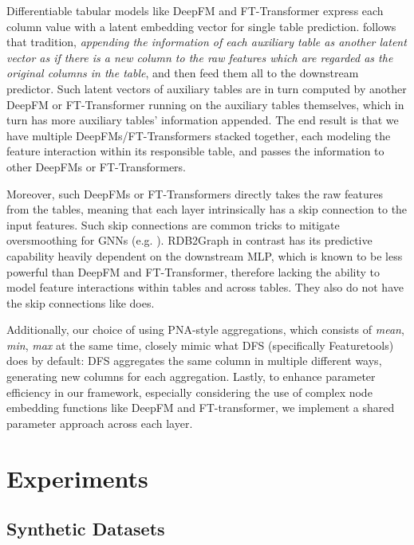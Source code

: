 Differentiable tabular models like DeepFM and FT-Transformer express each column value with a latent embedding vector for single table prediction.  \model{} follows that tradition, \emph{appending the information of each auxiliary table as another latent vector as if there is a new column to the raw features which are regarded as the original columns in the table}, and then feed them all to the downstream predictor.  Such latent vectors of auxiliary tables are in turn computed by another DeepFM or FT-Transformer running on the auxiliary tables themselves, which in turn has more auxiliary tables' information appended.  The end result is that we have multiple DeepFMs/FT-Transformers stacked together, each modeling the feature interaction within its responsible table, and passes the information to other DeepFMs or FT-Transformers.

Moreover, such DeepFMs or FT-Transformers directly takes the raw features from the tables, meaning that each \model{} layer intrinsically has a skip connection to the input features.  Such skip connections are common tricks to mitigate oversmoothing for GNNs (e.g. \cite{chen2020simple}). RDB2Graph in contrast has its predictive capability heavily dependent on the downstream MLP, which is known to be less powerful than DeepFM and FT-Transformer, therefore lacking the ability to model feature interactions within tables and across tables.  They also do not have the skip connections like \model{} does.

Additionally, our choice of using PNA-style aggregations, which consists of \textit{mean}, \textit{min}, \textit{max} at the same time, closely mimic what DFS (specifically Featuretools) does by default: DFS aggregates the same column in multiple different ways, generating new columns for each aggregation. Lastly, to enhance parameter efficiency in our framework, especially considering the use of complex node embedding functions like DeepFM and FT-transformer, we implement a shared parameter approach across each layer. 

\section{Experiments}\label{sec:experiments}

\subsection{Synthetic Datasets}
\label{sec:synthetic-experiments}

